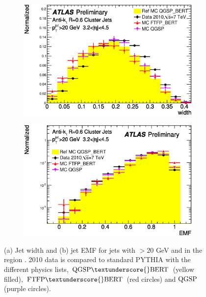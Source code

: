\begin{figure}
\centering
        \begin{subfigure}[b]{0.5\textwidth}
                \centering
                \includegraphics[width=\textwidth]{figures/JetPerformance/Width.eps}
        \end{subfigure}%
        \begin{subfigure}[b]{0.5\textwidth}
                \centering
                \includegraphics[width=\textwidth]{figures/JetPerformance/EMF.eps}
        \end{subfigure}%
\caption[Comparison of jet widths and EMF for data compared to PYTHIA with various physics lists]{
(a) Jet width and (b) jet EMF for jets with \pt{}$>20$ GeV and in the region .
2010 data is compared to standard PYTHIA with the different physics lists, $\rm QGSP\textunderscore{}BERT$ (yellow filled), $\rm FTFP\textunderscore{}BERT$ (red circles) and $\rm QGSP$ (purple circles).  
\label{JetPerf:Width_EMF}}
\end{figure}

